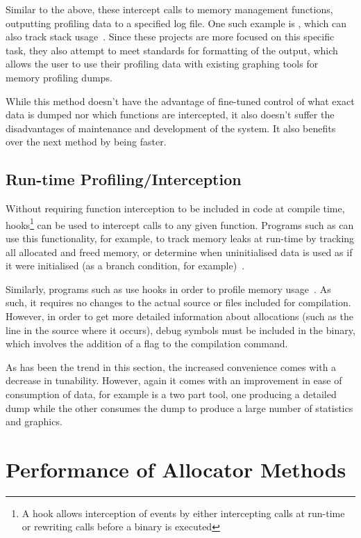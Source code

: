 Similar to the above, these intercept calls to memory management functions, outputting profiling data to a specified log file. One such example is , which can also track stack usage~\cite{malloccount}. Since these projects are more focused on this specific task, they also attempt to meet standards for formatting of the output, which allows the user to use their profiling data with existing graphing tools for memory profiling dumps.

While this method doesn't have the advantage of fine-tuned control of what exact data is dumped nor which functions are intercepted, it also doesn't suffer the disadvantages of maintenance and development of the system. It also benefits over the next method by being faster.

\subsection{Run-time Profiling/Interception}

Without requiring function interception to be included in code at compile time, hooks\footnote{A hook allows interception of events by either intercepting calls at run-time or rewriting calls before a binary is executed} can be used to intercept calls to any given function. Programs such as  can use this functionality, for example, to track memory leaks at run-time by tracking all allocated and freed memory, or determine when uninitialised data is used as if it were initialised (as a branch condition, for example)~\cite{valgrind}.

Similarly, programs such as  use hooks in order to profile memory usage~\cite{heaptrack}. As such, it requires no changes to the actual source or files included for compilation. However, in order to get more detailed information about allocations (such as the line in the source where it occurs), debug symbols must be included in the binary, which involves the addition of a flag to the compilation command.

As has been the trend in this section, the increased convenience comes with a decrease in tunability. However, again it comes with an improvement in ease of consumption of data, for example  is a two part tool, one producing a detailed dump while the other consumes the dump to produce a large number of statistics and graphics.

\section{Performance of Allocator Methods}

